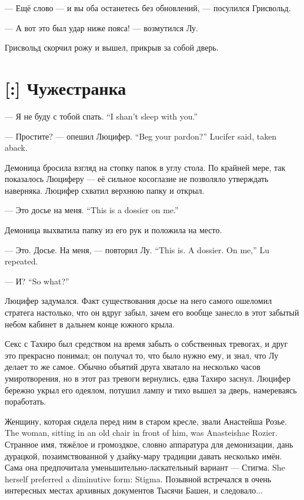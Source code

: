 --- Ещё слово --- и вы оба останетесь без обновлений, --- посулился Грисвольд.

--- А вот это был удар ниже пояса! --- возмутился Лу.

Грисвольд скорчил рожу и вышел, прикрыв за собой дверь.

\section{[:] Чужестранка}

{--- Я не буду с тобой спать.}
{``I shan't sleep with you.''}

{--- Простите? --- опешил Люцифер.}
{``Beg your pardon?'' Lucifer said, taken aback.}

Демоница бросила взгляд на стопку папок в углу стола.
По крайней мере, так показалось Люциферу --- её сильное косоглазие не позволяло утверждать наверняка.
Люцифер схватил верхнюю папку и открыл.

{--- Это досье на меня.}
{``This is a dossier on me.''}

Демоница выхватила папку из его рук и положила на место.

{--- Это. Досье. На меня, --- повторил Лу.}
{``This is. A dossier. On me,'' Lu repeated.}

{--- И?}
{``So what?''}

Люцифер задумался.
Факт существования досье на него самого ошеломил стратега настолько, что он вдруг забыл, зачем его вообще занесло в этот забытый небом кабинет в дальнем конце южного крыла.

Секс с Тахиро был средством на время забыть о собственных тревогах, и друг это прекрасно понимал;
он получал то, что было нужно ему, и знал, что Лу делает то же самое.
Обычно объятий друга хватало на несколько часов умиротворения, но в этот раз тревоги вернулись, едва Тахиро заснул.
Люцифер бережно укрыл его одеялом, потушил лампу и тихо вышел за дверь, намереваясь поработать.

{Женщину, которая сидела перед ним в старом кресле, звали Анастейша Розье.}
{The woman, sitting in an old chair in front of him, was Anasteishae Rozier.}
Странное имя, тяжёлое и громоздкое, словно аппаратура для демонизации, дань дурацкой, позаимствованной у дзайку-мару традиции давать несколько имён.
{Сама она предпочитала уменьшительно-ласкательный вариант --- Стигма.}
{She herself preferred a diminutive form: Stigma.}
Позывной встречался в очень интересных местах архивных документов Тысячи Башен, и следовало...

